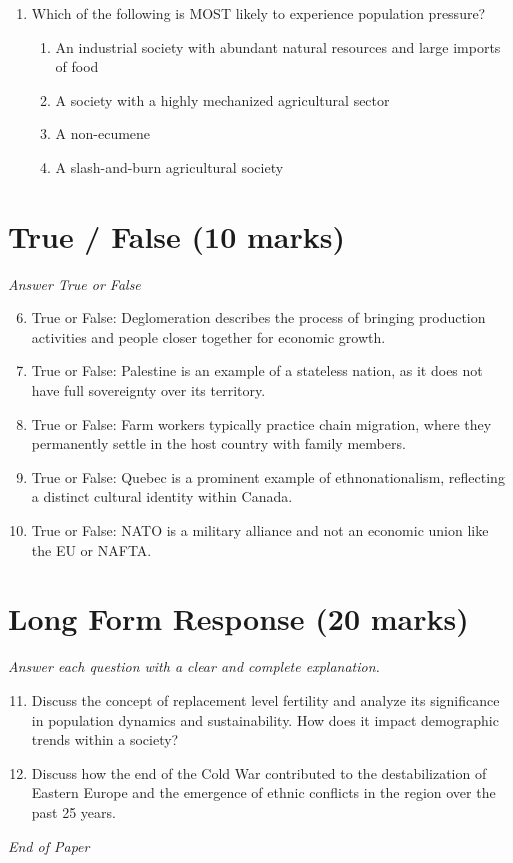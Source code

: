 \documentclass[12pt]{article}
\begin{document}
\begin{enumerate}[label=\arabic*.]
\begin{enumerate}[label=(\alph*)]
    \item Wheat
    \item Barley
    \item Millet
\end{enumerate}
\item Which of the following is MOST likely to experience population pressure?
\begin{enumerate}[label=(\alph*)]
    \item An industrial society with abundant natural resources and large imports of food
    \item A society with a highly mechanized agricultural sector
    \item A non-ecumene
    \item A slash-and-burn agricultural society
\end{enumerate}
\end{enumerate}

\section*{True / False (10 marks)}
\textit{Answer True or False}
\begin{enumerate}[label=\arabic*.]
\setcounter{enumi}{5}
\item True or False: Deglomeration describes the process of bringing production activities and people closer together for economic growth.
\item True or False: Palestine is an example of a stateless nation, as it does not have full sovereignty over its territory.
\item True or False: Farm workers typically practice chain migration, where they permanently settle in the host country with family members.
\item True or False: Quebec is a prominent example of ethnonationalism, reflecting a distinct cultural identity within Canada.
\item True or False: NATO is a military alliance and not an economic union like the EU or NAFTA.
\end{enumerate}

\section*{Long Form Response (20 marks)}
\textit{Answer each question with a clear and complete explanation.}
\begin{enumerate}[label=\arabic*.]
\setcounter{enumi}{10}
\item Discuss the concept of replacement level fertility and analyze its significance in population dynamics and sustainability. How does it impact demographic trends within a society?
\item Discuss how the end of the Cold War contributed to the destabilization of Eastern Europe and the emergence of ethnic conflicts in the region over the past 25 years.
\end{enumerate}

\vfill
\noindent\textit{End of Paper}
\end{document}
